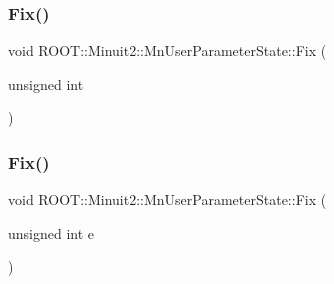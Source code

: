 \subsubsection{\texorpdfstring{Fix()}{Fix()}\hspace{0.1cm}{\footnotesize\ttfamily [1/6]}}
{\footnotesize\ttfamily void R\+O\+O\+T\+::\+Minuit2\+::\+Mn\+User\+Parameter\+State\+::\+Fix (\begin{DoxyParamCaption}\item[{unsigned int}]{ }\end{DoxyParamCaption})}

\mbox{\label{classROOT_1_1Minuit2_1_1MnUserParameterState_a89b898660495dd7fb95bb1c398941e17}} 
\subsubsection{\texorpdfstring{Fix()}{Fix()}\hspace{0.1cm}{\footnotesize\ttfamily [2/6]}}
{\footnotesize\ttfamily void R\+O\+O\+T\+::\+Minuit2\+::\+Mn\+User\+Parameter\+State\+::\+Fix (\begin{DoxyParamCaption}\item[{unsigned int}]{e }\end{DoxyParamCaption})}

